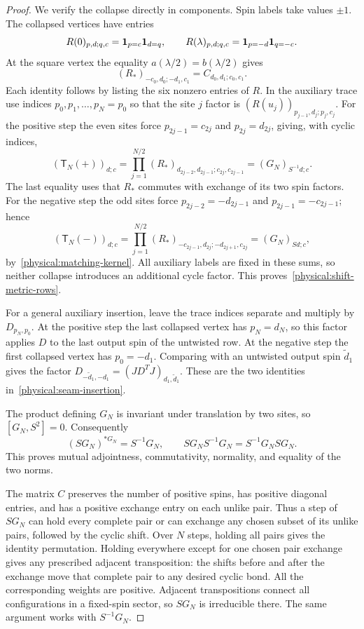 \begin{proof}
We verify the collapse directly in components. Spin labels take values
$\pm1$. The collapsed vertices have entries
\[
 R(0)_{p,d;q,c}=\mathbf 1_{p=c}\mathbf 1_{d=q},\qquad
 R(\lambda)_{p,d;q,c}=\mathbf 1_{p=-d}\mathbf 1_{q=-c}.
\]
At the square vertex the equality $a(\lambda/2)=b(\lambda/2)$ gives
\begin{equation}\label{physical:matching-kernel}
 (R_*)_{-c_0,d_0;-d_1,c_1}
       =C_{d_0,d_1;c_0,c_1}.
\end{equation}
Each identity follows by listing the six nonzero entries of $R$.
In the auxiliary trace use indices $p_0,p_1,\ldots,p_N=p_0$ so that
the site $j$ factor is $(R(u_j))_{p_{j-1},d_j;p_j,c_j}$.
For the positive step the even sites force
$p_{2j-1}=c_{2j}$ and $p_{2j}=d_{2j}$, giving, with cyclic indices,
\[
 (\mathsf T_N(+))_{d;c}
   =\prod_{j=1}^{N/2}
     (R_*)_{d_{2j-2},d_{2j-1};c_{2j},c_{2j-1}}
   =(G_N)_{S^{-1}d;c}.
\]
The last equality uses that $R_*$ commutes with exchange of its two
spin factors. For the negative step the odd sites force
$p_{2j-2}=-d_{2j-1}$ and $p_{2j-1}=-c_{2j-1}$; hence
\[
 (\mathsf T_N(-))_{d;c}
   =\prod_{j=1}^{N/2}
     (R_*)_{-c_{2j-1},d_{2j};-d_{2j+1},c_{2j}}
   =(G_N)_{Sd;c},
\]
by~\eqref{physical:matching-kernel}. All auxiliary labels are fixed in
these sums, so neither collapse introduces an additional cycle factor.
This proves~\eqref{physical:shift-metric-rows}.

For a general auxiliary insertion, leave the trace indices separate
and multiply by $D_{p_N,p_0}$. At the positive step the last collapsed
vertex has $p_N=d_N$, so this factor applies $D$ to the last output
spin of the untwisted row. At the negative step the first collapsed
vertex has $p_0=-d_1$. Comparing with an untwisted output spin
$\widetilde d_1$ gives the factor
$D_{-\widetilde d_1,-d_1}=(JD^TJ)_{d_1,\widetilde d_1}$.
These are the two identities in~\eqref{physical:seam-insertion}.

The product defining $G_N$ is invariant under translation by two sites,
so $[G_N,S^2]=0$. Consequently
\[
 (SG_N)^{*G_N}=S^{-1}G_N,\qquad
 SG_NS^{-1}G_N=S^{-1}G_NSG_N.
\]
This proves mutual adjointness, commutativity, normality, and equality of
the two norms.

The matrix $C$ preserves the number of positive spins, has positive
diagonal entries, and has a positive exchange entry on each unlike pair.
Thus a step of $SG_N$ can hold every complete pair or can exchange any
chosen subset of its unlike pairs, followed by the cyclic shift.
Over $N$ steps, holding all pairs gives the identity permutation. Holding
everywhere except for one chosen pair exchange gives any prescribed
adjacent transposition: the shifts before and after the exchange move
that complete pair to any desired cyclic bond. All the corresponding
weights are positive. Adjacent transpositions connect all configurations
in a fixed-spin sector, so $SG_N$ is irreducible there. The same argument
works with $S^{-1}G_N$.


\end{proof}
